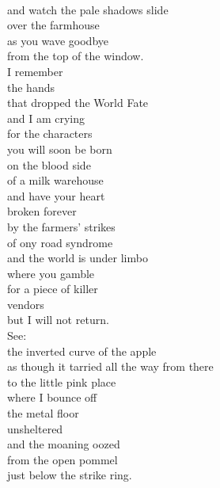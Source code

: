 \documentclass[smalldemyvopaper,11pt,twoside,onecolumn,openright,extrafontsizes]{memoir}
\newlength\drop
\begin{document}
\\and watch the pale shadows slide
\\over the farmhouse
\\as you wave goodbye
\\from the top of the window.
\\I remember
\\the hands
\\that dropped the World Fate
\\and I am crying
\\for the characters
\\you will soon be born
\\on the blood side
\\of a milk warehouse
\\and have your heart
\\broken forever
\\by the farmers' strikes
\\of ony road syndrome
\\and the world is under limbo
\\where you gamble
\\for a piece of killer
\\vendors
\\but I will not return.
\\See:
\\the inverted curve of the apple
\\as though it tarried all the way from there
\\to the little pink place
\\where I bounce off
\\the metal floor
\\unsheltered
\\and the moaning oozed
\\from the open pommel
\\just below the strike ring.
\end{document}
